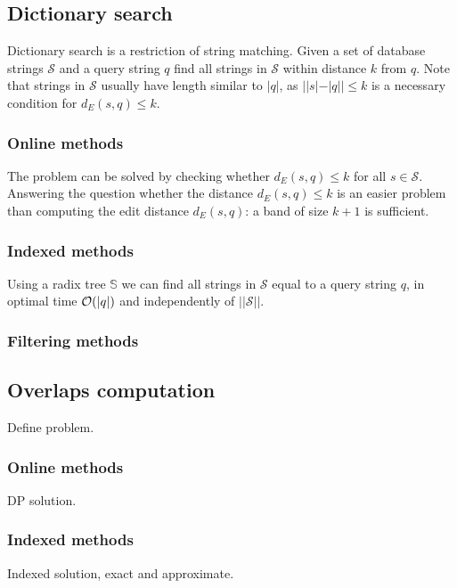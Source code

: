 
\subsection{Dictionary search}

Dictionary search is a restriction of string matching.
Given a set of database strings $\mathcal{S}$ and a query string $q$ find all strings in $\mathcal{S}$ within distance $k$ from $q$.
Note that strings in $\mathcal{S}$ usually have length similar to $|q|$, as $| |s| - |q| | \leq k$ is a necessary condition for $d_E(s,q) \leq k$.

\subsubsection{Online methods}

The problem can be solved by checking whether $d_E(s,q) \leq k$ for all $s \in \mathcal{S}$.
Answering the question whether the distance $d_E(s,q) \leq k$ is an easier problem than computing the edit distance $d_E(s,q)$: a band of size $k+1$ is sufficient.

\subsubsection{Indexed methods}

Using a radix tree $\mathbb{S}$ we can find all strings in $\mathcal{S}$ equal to a query string $q$, in optimal time $\mathcal{O}(|q|)$ and independently of $||\mathcal{S}||$.

\subsubsection{Filtering methods}



\subsection{Overlaps computation}

Define problem.

\subsubsection{Online methods}

DP solution.

\subsubsection{Indexed methods}

Indexed solution, exact and approximate.
